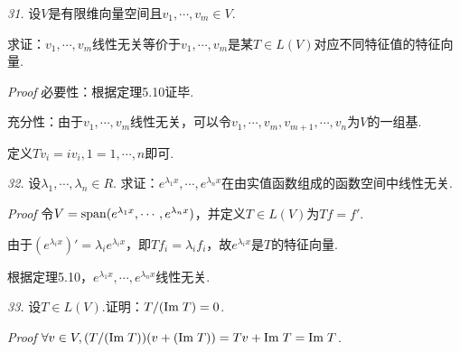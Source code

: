 \textit{31.}
设\(V\)是有限维向量空间且\(v_1,\cdots,v_m \in V\).

求证：\(v_1,\cdots,v_m\)线性无关等价于\(v_1,\cdots,v_m\)是某\(T \in L(V)\)对应不同特征值的特征向量.

\textit{Proof}
必要性：根据定理5.10证毕.

充分性：由于\(v_1,\cdots,v_m\)线性无关，可以令\(v_1,\cdots,v_m,v_{m+1},\cdots,v_n\)为\(V\)的一组基.

定义\(Tv_i=iv_i,1=1,\cdots,n\)即可.

\hspace*{\fill}

\textit{32.}
设\(\lambda_1,\cdots,\lambda_n \in R\).
求证：\(e^{\lambda_1 x},\cdots,e^{\lambda_n x}\)在由实值函数组成的函数空间中线性无关.

\textit{Proof}
令\(V=\mathrm{span} (e^{\lambda_1 x},\cdots,e^{\lambda_n x})\)，并定义\(T \in L(V)\)为\(Tf=f'\).

由于\((e^{\lambda_i x})'=\lambda_i e^{\lambda_i x}\)，即\(Tf_i=\lambda_i f_i\)，故\(e^{\lambda_i x}\)是\(T\)的特征向量.

根据定理5.10，\(e^{\lambda_1 x},\cdots,e^{\lambda_n x}\)线性无关.

\hspace*{\fill}

\textit{33.}
设\(T \in L(V)\).证明：\(T/(\mathrm{Im \;} T)=0\).

\textit{Proof}
\(\forall v \in V,(T/(\mathrm{Im \;} T))(v+(\mathrm{Im \;} T))=Tv+\mathrm{Im \;} T=\mathrm{Im \;} T\).

